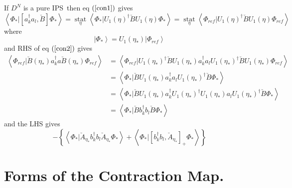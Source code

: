 \documentclass[aps,preprint]{revtex4}%
\begin{document}
If $D^{N}$ is a pure IPS\ then eq $\left(  \ref{con1}\right)  $ gives
\begin{equation}
\left\langle \Phi_{\ast}|\left[  a_{k}^{\dagger}a_{l},\breve{B}\right]
\Phi_{\ast}\right\rangle =\operatorname*{stat}_{\eta}\left\langle \Phi_{\ast
}|U_{1}\left(  \eta\right)  ^{\dagger}\breve{B}U_{1}\left(  \eta\right)
\Phi_{\ast}\right\rangle =\operatorname*{stat}_{\eta}\left\langle \Phi
_{ref}|U_{1}\left(  \eta\right)  ^{\dagger}\breve{B}U_{1}\left(  \eta\right)
\Phi_{ref}\right\rangle
\end{equation}
where
\begin{equation}
\left\vert \Phi_{\ast}\right\rangle =U_{1}\left(  \eta_{\ast}\right)
\left\vert \Phi_{ref}\right\rangle
\end{equation}
and RHS of eq $\left(  \ref{con2}\right)  $ gives
\begin{align}
\left\langle \Phi_{ref}|\breve{B}\left(  \eta_{\ast}\right)  a_{k}^{\dagger
}a\breve{B}\left(  \eta_{\ast}\right)  \Phi_{ref}\right\rangle  &
=\left\langle \Phi_{ref}|U_{1}\left(  \eta_{\ast}\right)  ^{\dagger}\breve
{B}U_{1}\left(  \eta_{\ast}\right)  a_{k}^{\dagger}a_{l}U_{1}\left(
\eta_{\ast}\right)  ^{\dagger}\breve{B}U_{1}\left(  \eta_{\ast}\right)
\Phi_{ref}\right\rangle \nonumber\\
&  =\left\langle \Phi_{\ast}|\breve{B}U_{1}\left(  \eta_{\ast}\right)
a_{k}^{\dagger}a_{l}U_{1}\left(  \eta_{\ast}\right)  ^{\dagger}\breve{B}%
\Phi_{\ast}\right\rangle \nonumber\\
&  =\left\langle \Phi_{\ast}|\breve{B}U_{1}\left(  \eta_{\ast}\right)
a_{k}^{\dagger}U_{1}\left(  \eta_{\ast}\right)  ^{\dagger}U_{1}\left(
\eta_{\ast}\right)  a_{l}U_{1}\left(  \eta_{\ast}\right)  ^{\dagger}\breve
{B}\Phi_{\ast}\right\rangle \nonumber\\
&  =\left\langle \Phi_{\ast}|\breve{B}b_{k}^{\dagger}b_{l}\breve{B}\Phi_{\ast
}\right\rangle
\end{align}
and the LHS gives
\begin{equation}
-\left\{  \left\langle \Phi_{\ast}|\breve{A}_{\eta_{\ast}}b_{k}^{\dagger}%
b_{l}\breve{A}_{\eta_{\ast}}\Phi_{\ast}\right\rangle +\left\langle \Phi_{\ast
}|\left[  b_{k}^{\dagger}b_{l},\breve{A}_{\eta_{\ast}}\right]  _{+}\Phi_{\ast
}\right\rangle \right\}
\end{equation}


\section{Forms of the Contraction Map.}
\end{document}

